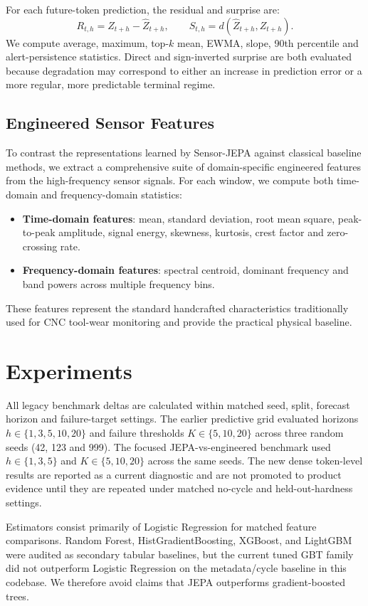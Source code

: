 \documentclass[10pt,journal,compsoc]{IEEEtran}
\begin{document}
For each future-token prediction, the residual and surprise are:
\begin{equation}
    R_{t,h}=Z_{t+h}-\hat{Z}_{t+h}, \qquad
    S_{t,h}=d(\hat{Z}_{t+h},Z_{t+h}).
\end{equation}
We compute average, maximum, top-$k$ mean, EWMA, slope, 90th percentile and alert-persistence statistics. Direct and sign-inverted surprise are both evaluated because degradation may correspond to either an increase in prediction error or a more regular, more predictable terminal regime.

\subsection{Engineered Sensor Features}
To contrast the representations learned by Sensor-JEPA against classical baseline methods, we extract a comprehensive suite of domain-specific engineered features from the high-frequency sensor signals. For each window, we compute both time-domain and frequency-domain statistics:
\begin{itemize}
    \item \textbf{Time-domain features}: mean, standard deviation, root mean square, peak-to-peak amplitude, signal energy, skewness, kurtosis, crest factor and zero-crossing rate.
    \item \textbf{Frequency-domain features}: spectral centroid, dominant frequency and band powers across multiple frequency bins.
\end{itemize}
These features represent the standard handcrafted characteristics traditionally used for CNC tool-wear monitoring and provide the practical physical baseline.

\section{Experiments}
All legacy benchmark deltas are calculated within matched seed, split, forecast horizon and failure-target settings. The earlier predictive grid evaluated horizons $h \in \{1,3,5,10,20\}$ and failure thresholds $K \in \{5,10,20\}$ across three random seeds (42, 123 and 999). The focused JEPA-vs-engineered benchmark used $h \in \{1,3,5\}$ and $K \in \{5,10,20\}$ across the same seeds. The new dense token-level results are reported as a current diagnostic and are not promoted to product evidence until they are repeated under matched no-cycle and held-out-hardness settings.

Estimators consist primarily of Logistic Regression for matched feature comparisons. Random Forest, HistGradientBoosting, XGBoost, and LightGBM were audited as secondary tabular baselines, but the current tuned GBT family did not outperform Logistic Regression on the metadata/cycle baseline in this codebase. We therefore avoid claims that JEPA outperforms gradient-boosted trees.
\end{document}
